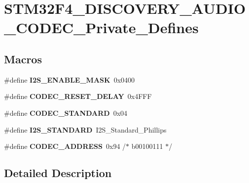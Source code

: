 \hypertarget{group___s_t_m32_f4___d_i_s_c_o_v_e_r_y___a_u_d_i_o___c_o_d_e_c___private___defines}{\section{S\-T\-M32\-F4\-\_\-\-D\-I\-S\-C\-O\-V\-E\-R\-Y\-\_\-\-A\-U\-D\-I\-O\-\_\-\-C\-O\-D\-E\-C\-\_\-\-Private\-\_\-\-Defines}
\label{group___s_t_m32_f4___d_i_s_c_o_v_e_r_y___a_u_d_i_o___c_o_d_e_c___private___defines}
}
\subsection*{Macros}
\begin{DoxyCompactItemize}
\item 
\hypertarget{group___s_t_m32_f4___d_i_s_c_o_v_e_r_y___a_u_d_i_o___c_o_d_e_c___private___defines_gae9df95d6d2ab6dcd6fdc3cc42e958300}{\#define {\bfseries I2\-S\-\_\-\-E\-N\-A\-B\-L\-E\-\_\-\-M\-A\-S\-K}~0x0400}\label{group___s_t_m32_f4___d_i_s_c_o_v_e_r_y___a_u_d_i_o___c_o_d_e_c___private___defines_gae9df95d6d2ab6dcd6fdc3cc42e958300}

\item 
\hypertarget{group___s_t_m32_f4___d_i_s_c_o_v_e_r_y___a_u_d_i_o___c_o_d_e_c___private___defines_ga2552fcc430ecf151cbc9d13bd9264373}{\#define {\bfseries C\-O\-D\-E\-C\-\_\-\-R\-E\-S\-E\-T\-\_\-\-D\-E\-L\-A\-Y}~0x4\-F\-F\-F}\label{group___s_t_m32_f4___d_i_s_c_o_v_e_r_y___a_u_d_i_o___c_o_d_e_c___private___defines_ga2552fcc430ecf151cbc9d13bd9264373}

\item 
\hypertarget{group___s_t_m32_f4___d_i_s_c_o_v_e_r_y___a_u_d_i_o___c_o_d_e_c___private___defines_ga7014a1e3190e04c97b6899d85cd14be8}{\#define {\bfseries C\-O\-D\-E\-C\-\_\-\-S\-T\-A\-N\-D\-A\-R\-D}~0x04}\label{group___s_t_m32_f4___d_i_s_c_o_v_e_r_y___a_u_d_i_o___c_o_d_e_c___private___defines_ga7014a1e3190e04c97b6899d85cd14be8}

\item 
\hypertarget{group___s_t_m32_f4___d_i_s_c_o_v_e_r_y___a_u_d_i_o___c_o_d_e_c___private___defines_ga9034a9122756918439ef3aea85657a92}{\#define {\bfseries I2\-S\-\_\-\-S\-T\-A\-N\-D\-A\-R\-D}~I2\-S\-\_\-\-Standard\-\_\-\-Phillips}\label{group___s_t_m32_f4___d_i_s_c_o_v_e_r_y___a_u_d_i_o___c_o_d_e_c___private___defines_ga9034a9122756918439ef3aea85657a92}

\item 
\hypertarget{group___s_t_m32_f4___d_i_s_c_o_v_e_r_y___a_u_d_i_o___c_o_d_e_c___private___defines_ga004941059b346732ec711acd594dfe7d}{\#define {\bfseries C\-O\-D\-E\-C\-\_\-\-A\-D\-D\-R\-E\-S\-S}~0x94  /$\ast$ b00100111 $\ast$/}\label{group___s_t_m32_f4___d_i_s_c_o_v_e_r_y___a_u_d_i_o___c_o_d_e_c___private___defines_ga004941059b346732ec711acd594dfe7d}

\end{DoxyCompactItemize}


\subsection{Detailed Description}
